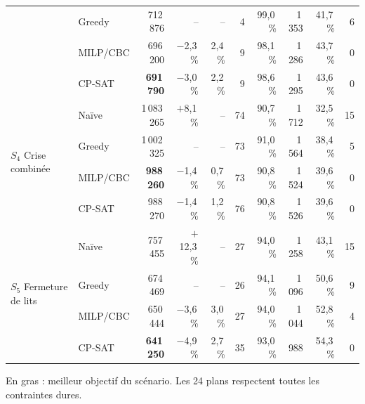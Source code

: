 \begin{table}[H]
{\begin{tabular}{llrrrrrrrr}
         & Greedy & 712\,876 & -- & -- & 4 & 99{,}0\,\% & 1\,353 & 41{,}7\,\% & 6 \\
         & MILP/CBC & 696\,200 & $-$2{,}3\,\% & 2{,}4\,\% & 9 & 98{,}1\,\% & 1\,286 & 43{,}7\,\% & 0 \\
         & CP-SAT & \textbf{691\,790} & $-$3{,}0\,\% & 2{,}2\,\% & 9 & 98{,}6\,\% & 1\,295 & 43{,}6\,\% & 0 \\
        \midrule
        \multirow{4}{*}{$S_4$ Crise combinée} & Naïve & 1\,083\,265 & $+$8{,}1\,\% & -- & 74 & 90{,}7\,\% & 1\,712 & 32{,}5\,\% & 15 \\
         & Greedy & 1\,002\,325 & -- & -- & 73 & 91{,}0\,\% & 1\,564 & 38{,}4\,\% & 5 \\
         & MILP/CBC & \textbf{988\,260} & $-$1{,}4\,\% & 0{,}7\,\% & 73 & 90{,}8\,\% & 1\,524 & 39{,}6\,\% & 0 \\
         & CP-SAT & 988\,270 & $-$1{,}4\,\% & 1{,}2\,\% & 76 & 90{,}8\,\% & 1\,526 & 39{,}6\,\% & 0 \\
        \midrule
        \multirow{4}{*}{$S_5$ Fermeture de lits} & Naïve & 757\,455 & $+$12{,}3\,\% & -- & 27 & 94{,}0\,\% & 1\,258 & 43{,}1\,\% & 15 \\
         & Greedy & 674\,469 & -- & -- & 26 & 94{,}1\,\% & 1\,096 & 50{,}6\,\% & 9 \\
         & MILP/CBC & 650\,444 & $-$3{,}6\,\% & 3{,}0\,\% & 27 & 94{,}0\,\% & 1\,044 & 52{,}8\,\% & 4 \\
         & CP-SAT & \textbf{641\,250} & $-$4{,}9\,\% & 2{,}7\,\% & 35 & 93{,}0\,\% & 988 & 54{,}3\,\% & 0 \\
        \bottomrule
    \end{tabular}}
    \par\vspace{3pt}
    {\footnotesize En gras : meilleur objectif du scénario. Les 24 plans respectent toutes les contraintes dures.}
\end{table}
